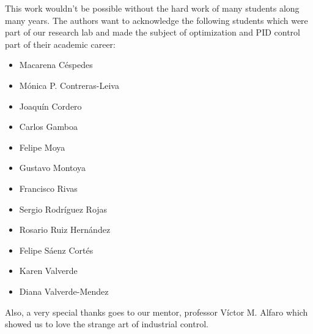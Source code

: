 %
%


This work wouldn't be possible without the hard work of many students along many years. The authors want to acknowledge the following students which were part of our research lab and made the subject of optimization and PID control part of their academic career:
\begin{itemize}
	\item Macarena Céspedes
	\item Mónica P. Contreras-Leiva
	\item Joaquín Cordero
	\item Carlos Gamboa
	\item Felipe Moya
	\item Gustavo Montoya
	\item Francisco Rivas
	\item Sergio Rodríguez Rojas
	\item Rosario Ruiz Hernández
	\item Felipe Sáenz Cortés
	\item Karen Valverde
	\item Diana Valverde-Mendez
\end{itemize}  

Also, a very special thanks goes to our mentor, professor Víctor M. Alfaro which showed us to love the strange art of industrial control.